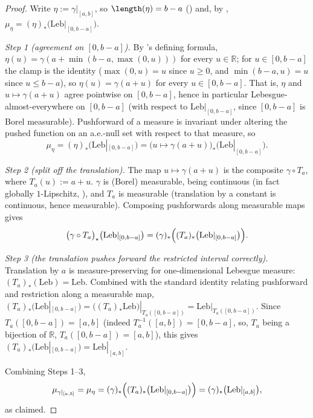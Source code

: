 \begin{proof}
  Write $\eta := \gamma|_{[a,b]}$, so $\length(\eta) = b - a$ () and, by
  , $\mu_\eta = (\eta)_*\bigl(\mathrm{Leb}|_{[0,b-a]}\bigr)$.

  \emph{Step 1 (agreement on $[0,b-a]$).} By 's defining formula,
  $\eta(u) = \gamma(a + \min(b-a,\max(0,u)))$ for every $u \in \mathbb{R}$; for $u \in [0,b-a]$ the
  clamp is the identity ($\max(0,u)=u$ since $u \ge 0$, and $\min(b-a,u)=u$ since $u \le b-a$), so
  $\eta(u) = \gamma(a+u)$ for every $u \in [0,b-a]$. That is, $\eta$ and $u \mapsto \gamma(a+u)$
  agree pointwise on $[0,b-a]$, hence in particular Lebesgue-almost-everywhere on $[0,b-a]$ (with
  respect to $\mathrm{Leb}|_{[0,b-a]}$, since $[0,b-a]$ is Borel measurable). Pushforward of a
  measure is invariant under altering the pushed function on an a.e.-null set with respect to that
  measure, so
  \[
    \mu_\eta = (\eta)_*\bigl(\mathrm{Leb}|_{[0,b-a]}\bigr)
      = \bigl(u \mapsto \gamma(a+u)\bigr)_*\bigl(\mathrm{Leb}|_{[0,b-a]}\bigr)
    .
  \]

  \emph{Step 2 (split off the translation).} The map $u \mapsto \gamma(a+u)$ is the composite
  $\gamma \circ T_a$, where $T_a(u) := a+u$. $\gamma$ is (Borel) measurable, being continuous
  (in fact globally $1$-Lipschitz, ), and $T_a$ is measurable (translation
  by a constant is continuous, hence measurable). Composing pushforwards along measurable maps
  gives
  \[
    \bigl(\gamma \circ T_a\bigr)_*\bigl(\mathrm{Leb}|_{[0,b-a]}\bigr)
      = (\gamma)_*\Bigl((T_a)_*\bigl(\mathrm{Leb}|_{[0,b-a]}\bigr)\Bigr)
    .
  \]

  \emph{Step 3 (the translation pushes forward the restricted interval correctly).} Translation by
  $a$ is measure-preserving for one-dimensional Lebesgue measure: $(T_a)_*(\mathrm{Leb}) =
  \mathrm{Leb}$. Combined with the standard identity relating pushforward and restriction along a
  measurable map, $(T_a)_*\bigl(\mathrm{Leb}|_{[0,b-a]}\bigr) =
  \bigl((T_a)_*\mathrm{Leb}\bigr)|_{T_a([0,b-a])} = \mathrm{Leb}|_{T_a([0,b-a])}$. Since
  $T_a([0,b-a]) = [a,b]$ (indeed $T_a^{-1}([a,b]) = [0,b-a]$, so, $T_a$ being a bijection of
  $\mathbb{R}$, $T_a([0,b-a])=[a,b]$), this gives $(T_a)_*\bigl(\mathrm{Leb}|_{[0,b-a]}\bigr) =
  \mathrm{Leb}|_{[a,b]}$.

  Combining Steps 1--3,
  \[
    \mu_{\gamma|_{[a,b]}} = \mu_\eta = (\gamma)_*\Bigl((T_a)_*\bigl(\mathrm{Leb}|_{[0,b-a]}\bigr)\Bigr)
      = (\gamma)_*\bigl(\mathrm{Leb}|_{[a,b]}\bigr)
    ,
  \]
  as claimed.
\end{proof}
